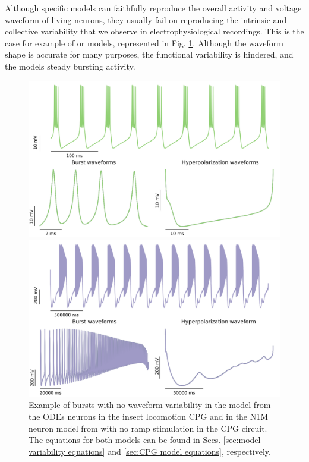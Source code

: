 Although specific models can faithfully reproduce the overall activity and voltage waveform  of living neurons, they usually fail on reproducing the intrinsic and collective variability that we observe in electrophysiological recordings. This is the case for example of \textcite{ghigliazza_minimal_2004b} or \textcite{vavoulis_dynamic_2007} models, represented in Fig. \ref{fig:model burst no variability}. Although the waveform shape is accurate for many purposes, the functional variability is hindered, and the models steady bursting activity. 

\begin{figure}[hbt]
	\centering
	\begin{minipage}{0.48\textwidth}
		\includegraphics[width=\textwidth]{img/invariants/variability/GHmodel.png}
	\end{minipage}
	\begin{minipage}{0.48\textwidth}
		\includegraphics[width=\textwidth]{img/invariants/variability/N1Mnovar.png}
	\end{minipage}
	\caption{Example of bursts with no waveform variability in the \textcite{ghigliazza_minimal_2004b} model from the ODEs neurons in the insect locomotion CPG and in the N1M neuron model from \textcite{vavoulis_dynamic_2007} with no ramp stimulation in the CPG circuit. The equations for both models can be found in Secs. \ref{sec:model variability equations} and \ref{sec:CPG model equations}, respectively.}
	\label{fig:model burst no variability}
\end{figure}

